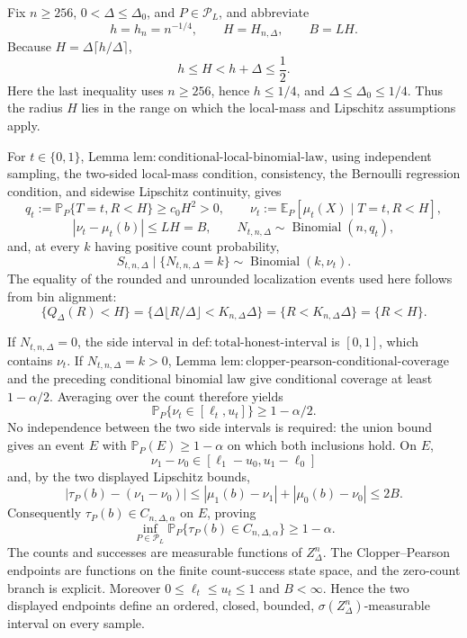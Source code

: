 Fix \(n\geq256\), \(0<\Delta\leq\Delta_0\), and \(P\in\mathcal P_L\), and abbreviate
\[
 h=h_n=n^{-1/4},\qquad H=H_{n,\Delta},\qquad B=LH.
\]
Because \(H=\Delta\lceil h/\Delta\rceil\),
\[
 h\leq H<h+\Delta\leq\frac12.
\]
Here the last inequality uses \(n\geq256\), hence \(h\leq1/4\), and \(\Delta\leq\Delta_0\leq1/4\).  Thus the radius \(H\) lies in the range on which the local-mass and Lipschitz assumptions apply.

For \(t\in\{0,1\}\), Lemma \(\mathrm{lem:conditional\text{-}local\text{-}binomial\text{-}law}\), using independent sampling, the two-sided local-mass condition, consistency, the Bernoulli regression condition, and sidewise Lipschitz continuity, gives
\[
 q_t:=\mathbb P_P\{T=t,R<H\}\geq c_0H^2>0,
 \qquad
 \nu_t:=\mathbb E_P[\mu_t(X)\mid T=t,R<H],
\]
\[
 |\nu_t-\mu_t(b)|\leq LH=B,
 \qquad
 N_{t,n,\Delta}\sim\operatorname{Binomial}(n,q_t),
\]
and, at every \(k\) having positive count probability,
\[
 S_{t,n,\Delta}\mid\{N_{t,n,\Delta}=k\}
 \sim\operatorname{Binomial}(k,\nu_t).
\]
The equality of the rounded and unrounded localization events used here follows from bin alignment:
\[
 \{Q_\Delta(R)<H\}
 =\{\Delta\lfloor R/\Delta\rfloor<K_{n,\Delta}\Delta\}
 =\{R<K_{n,\Delta}\Delta\}
 =\{R<H\}.
\]

If \(N_{t,n,\Delta}=0\), the side interval in \(\mathrm{def:total\text{-}honest\text{-}interval}\) is \([0,1]\), which contains \(\nu_t\).  If \(N_{t,n,\Delta}=k>0\), Lemma \(\mathrm{lem:clopper\text{-}pearson\text{-}conditional\text{-}coverage}\) and the preceding conditional binomial law give conditional coverage at least \(1-\alpha/2\).  Averaging over the count therefore yields
\[
 \mathbb P_P\{\nu_t\in[\ell_t,u_t]\}\geq1-\alpha/2.
\]
No independence between the two side intervals is required: the union bound gives an event \(E\) with \(\mathbb P_P(E)\geq1-\alpha\) on which both inclusions hold.  On \(E\),
\[
 \nu_1-\nu_0\in[\ell_1-u_0,u_1-\ell_0]
\]
and, by the two displayed Lipschitz bounds,
\[
 \left|\tau_P(b)-(\nu_1-\nu_0)\right|
 \leq|\mu_1(b)-\nu_1|+|\mu_0(b)-\nu_0|
 \leq2B.
\]
Consequently \(\tau_P(b)\in C_{n,\Delta,\alpha}\) on \(E\), proving
\[
 \inf_{P\in\mathcal P_L}
 \mathbb P_P\{\tau_P(b)\in C_{n,\Delta,\alpha}\}\geq1-\alpha.
\]
The counts and successes are measurable functions of \(Z_\Delta^n\).  The Clopper--Pearson endpoints are functions on the finite count-success state space, and the zero-count branch is explicit.  Moreover \(0\leq\ell_t\leq u_t\leq1\) and \(B<\infty\).  Hence the two displayed endpoints define an ordered, closed, bounded, \(\sigma(Z_\Delta^n)\)-measurable interval on every sample.

